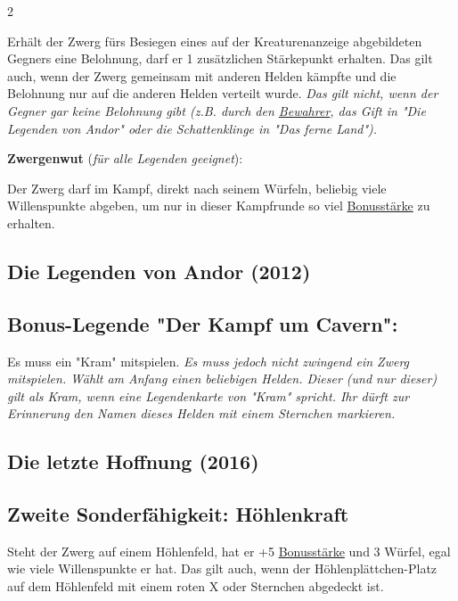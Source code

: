 \documentclass[10pt, a4paper, oneside]{book}
\newcommand{\fan}[1]{\textit{#1}}
\begin{document}
\begin{multicols*}{2}
\begin{nobgcolor}
Erhält der Zwerg fürs Besiegen eines auf der Kreaturenanzeige abgebildeten Gegners eine Belohnung, darf er 1 zusätzlichen Stärkepunkt erhalten. Das gilt auch, wenn der Zwerg gemeinsam mit anderen Helden kämpfte und die Belohnung nur auf die anderen Helden verteilt wurde.
\supercite{BGG:extrastaerke-zwerg}
\fan{Das gilt nicht, wenn der Gegner gar keine Belohnung gibt (z.B. durch den \hyperref[Bewahrer]{Bewahrer}, das Gift in "Die Legenden von Andor" oder die Schattenklinge in "Das ferne Land").}

\bullet{} \textbf{Zwergenwut} (\fan{für alle Legenden geeignet}):

Der Zwerg darf im Kampf, direkt nach seinem Würfeln, beliebig viele Willenspunkte abgeben, um nur in dieser Kampfrunde so viel \hyperref[Bonusstärke]{Bonusstärke} zu erhalten. 
\supercite{GdK}


\end{nobgcolor}


\begin{bgcolor}
\section{Die Legenden von Andor (2012)}

\subsection{Bonus-Legende "Der Kampf um Cavern":}

Es muss ein "Kram" mitspielen.
\supercite{BL_KuC:A}
\fan{Es muss jedoch nicht zwingend ein Zwerg mitspielen. Wählt am Anfang einen beliebigen Helden. Dieser (und nur dieser) gilt als Kram, wenn eine Legendenkarte von "Kram" spricht. Ihr dürft zur Erinnerung den Namen dieses Helden mit einem Sternchen markieren.}


\end{bgcolor}


\begin{bgcolor}
\section{Die letzte Hoffnung (2016)}


\subsection{Zweite Sonderfähigkeit: Höhlenkraft}

Steht der Zwerg auf einem Höhlenfeld, hat er +5 \hyperref[Bonusstärke]{Bonusstärke} und 3 Würfel, egal wie viele Willenspunkte er hat.
\supercite{DlH:Begleitheft,DlH11:Heldenkarte_Zwerg}
Das gilt auch, wenn der Höhlenplättchen-Platz auf dem Höhlenfeld mit einem roten X\supercite{DlH13:a} oder Sternchen\supercite{DlH15:a} abgedeckt ist.




\end{bgcolor}
\end{multicols*}
\end{document}
